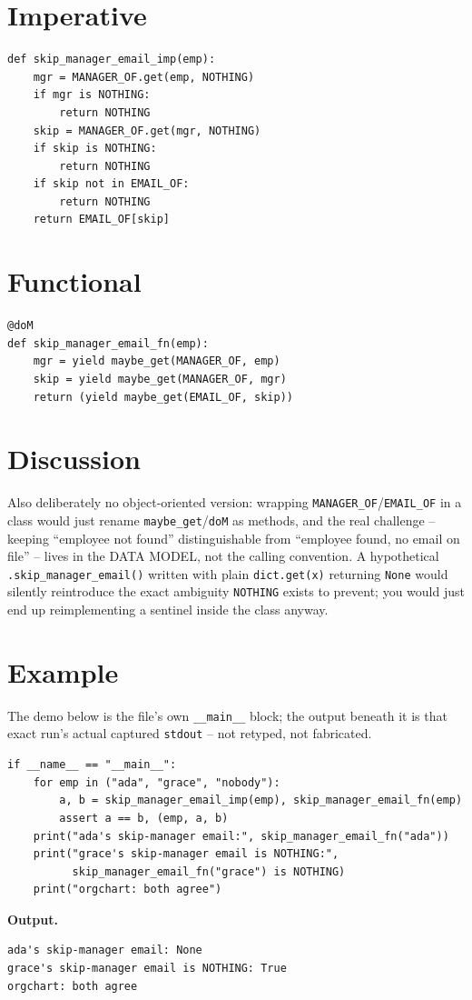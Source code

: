 \documentclass[10pt,letterpaper]{book}
\begin{document}
\section*{Imperative}
\begin{lstlisting}[style=code]
def skip_manager_email_imp(emp):
    mgr = MANAGER_OF.get(emp, NOTHING)
    if mgr is NOTHING:
        return NOTHING
    skip = MANAGER_OF.get(mgr, NOTHING)
    if skip is NOTHING:
        return NOTHING
    if skip not in EMAIL_OF:
        return NOTHING
    return EMAIL_OF[skip]
\end{lstlisting}
\section*{Functional}
\begin{lstlisting}[style=code]
@doM
def skip_manager_email_fn(emp):
    mgr = yield maybe_get(MANAGER_OF, emp)
    skip = yield maybe_get(MANAGER_OF, mgr)
    return (yield maybe_get(EMAIL_OF, skip))
\end{lstlisting}
\section*{Discussion}

Also deliberately no object-oriented version: wrapping
\texttt{MANAGER\_OF}/\texttt{EMAIL\_OF} in a class would just rename
\texttt{maybe\_get}/\texttt{doM} as methods, and the real challenge --
keeping ``employee not found'' distinguishable from ``employee found, no
email on file'' -- lives in the DATA MODEL, not the calling convention. A
hypothetical \texttt{.skip\_manager\_email()} written with plain
\texttt{dict.get(x)} returning \texttt{None} would silently reintroduce
the exact ambiguity \texttt{NOTHING} exists to prevent; you would just end
up reimplementing a sentinel inside the class anyway.

\section*{Example}
The demo below is the file's own \texttt{\_\_main\_\_} block; the output beneath it is that exact run's actual captured \texttt{stdout} -- not retyped, not fabricated.
\begin{lstlisting}[style=code]
if __name__ == "__main__":
    for emp in ("ada", "grace", "nobody"):
        a, b = skip_manager_email_imp(emp), skip_manager_email_fn(emp)
        assert a == b, (emp, a, b)
    print("ada's skip-manager email:", skip_manager_email_fn("ada"))
    print("grace's skip-manager email is NOTHING:",
          skip_manager_email_fn("grace") is NOTHING)
    print("orgchart: both agree")
\end{lstlisting}
\noindent\textbf{Output.}
\begin{lstlisting}[style=ex]
ada's skip-manager email: None
grace's skip-manager email is NOTHING: True
orgchart: both agree
\end{lstlisting}
\end{document}
